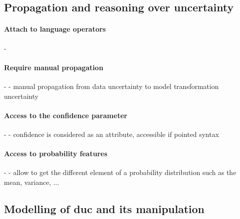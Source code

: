 \subsection{Propagation and reasoning over uncertainty}

\paragraph{Attach to language operators}
- \cite{DBLP:conf/models/BurguenoBMV18, baudin2017openturns, DBLP:journals/corr/BorgstromGGMG13, DBLP:conf/ecmdafa/BertoaMBBTV18, osti_1430202, DBLP:conf/sle/MayerhoferWV16, DBLP:journals/peerj-cs/SalvatierWF16, DBLP:conf/quatic/VallecilloMO16, DBLP:conf/popl/BhatAVG12}

\paragraph{Require manual propagation}
- \cite{DBLP:conf/models/BurguenoBMV18}
	- manual propagation from data uncertainty to model transformation uncertainty 
	
\paragraph{Access to the confidence parameter}
- \cite{DBLP:conf/models/BurguenoBMV18, DBLP:conf/sle/MayerhoferWV16, DBLP:conf/quatic/VallecilloMO16}
	- confidence is considered as an attribute, accessible if pointed syntax
	
\paragraph{Access to probability features}
- \cite{baudin2017openturns, DBLP:journals/corr/BorgstromGGMG13, DBLP:conf/ecmdafa/BertoaMBBTV18, DBLP:conf/asplos/BornholtMM14, osti_1430202, DBLP:journals/peerj-cs/SalvatierWF16}
	- allow to get the different element of a probability distribution such as the mean, variance, ...




\subsection[Modelling of data uncertainty and its manipulation]{Modelling of \gls{duc} and its manipulation}